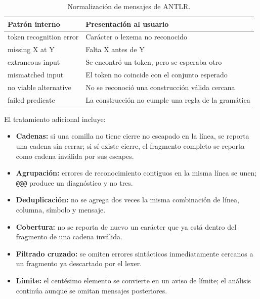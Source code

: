 \documentclass[12pt,letterpaper,oneside]{report}
\newcommand{\archivo}[1]{\texttt{#1}}
\begin{document}
\begin{table}[H]
\centering
\caption{Normalización de mensajes de ANTLR.}
\label{tab:errores}
\begin{tabularx}{\textwidth}{>{\ttfamily}l X}
\toprule
Patrón interno & Presentación al usuario \\
\midrule
token recognition error & Carácter o lexema no reconocido \\
missing X at Y & Falta X antes de Y \\
extraneous input & Se encontró un token, pero se esperaba otro \\
mismatched input & El token no coincide con el conjunto esperado \\
no viable alternative & No se reconoció una construcción válida cercana \\
failed predicate & La construcción no cumple una regla de la gramática \\
\bottomrule
\end{tabularx}
\end{table}

El tratamiento adicional incluye:

\begin{itemize}
  \item \textbf{Cadenas:} si una comilla no tiene cierre no escapado en la línea, se
        reporta una cadena sin cerrar; si sí existe cierre, el fragmento completo se
        reporta como cadena inválida por sus escapes.
  \item \textbf{Agrupación:} errores de reconocimiento contiguos en la misma línea se
        unen; \archivo{@@@} produce un diagnóstico y no tres.
  \item \textbf{Deduplicación:} no se agrega dos veces la misma combinación de línea,
        columna, símbolo y mensaje.
  \item \textbf{Cobertura:} no se reporta de nuevo un carácter que ya está dentro del
        fragmento de una cadena inválida.
  \item \textbf{Filtrado cruzado:} se omiten errores sintácticos inmediatamente
        cercanos a un fragmento ya descartado por el lexer.
  \item \textbf{Límite:} el centésimo elemento se convierte en un aviso de límite;
        el análisis continúa aunque se omitan mensajes posteriores.
\end{itemize}
\end{document}
